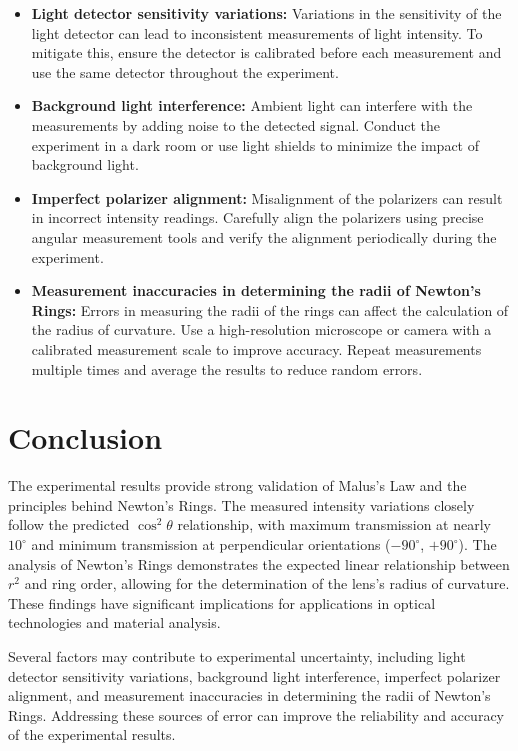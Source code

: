 \documentclass[journal]{IEEEtran}
\begin{document}
\begin{itemize}
    \item \textbf{Light detector sensitivity variations:} Variations in the sensitivity of the light detector can lead to inconsistent measurements of light intensity. To mitigate this, ensure the detector is calibrated before each measurement and use the same detector throughout the experiment.
    
    \item \textbf{Background light interference:} Ambient light can interfere with the measurements by adding noise to the detected signal. Conduct the experiment in a dark room or use light shields to minimize the impact of background light.
    
    \item \textbf{Imperfect polarizer alignment:} Misalignment of the polarizers can result in incorrect intensity readings. Carefully align the polarizers using precise angular measurement tools and verify the alignment periodically during the experiment.
    
    \item \textbf{Measurement inaccuracies in determining the radii of Newton's Rings:} Errors in measuring the radii of the rings can affect the calculation of the radius of curvature. Use a high-resolution microscope or camera with a calibrated measurement scale to improve accuracy. Repeat measurements multiple times and average the results to reduce random errors.
\end{itemize}
\section{Conclusion}
The experimental results provide strong validation of Malus's Law and the principles behind Newton's Rings. The measured intensity variations closely follow the predicted $\cos^2\theta$ relationship, with maximum transmission at nearly $10^\circ$ and minimum transmission at perpendicular orientations ($-90^\circ$, $+90^\circ$). The analysis of Newton's Rings demonstrates the expected linear relationship between $r^2$ and ring order, allowing for the determination of the lens's radius of curvature. These findings have significant implications for applications in optical technologies and material analysis.

Several factors may contribute to experimental uncertainty, including light detector sensitivity variations, background light interference, imperfect polarizer alignment, and measurement inaccuracies in determining the radii of Newton's Rings. Addressing these sources of error can improve the reliability and accuracy of the experimental results.
\end{document}
